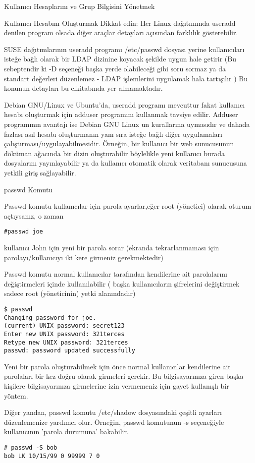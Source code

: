 \begin{section}{Kullanıcı Hesaplarını ve Grup Bilgisini Yönetmek}
\begin{subsection}{Kullanıcı Hesabını Oluşturmak}
Dikkat edin: Her Linux dağıtımında useradd denilen program olsada diğer araçlar detayları açısından farklılık gösterebilir.

SUSE dağıtımlarının useradd programı /etc/passwd dosyası yerine kullanıcıları isteğe bağlı olarak bir LDAP dizinine koyacak şekilde uygun hale getirir (Bu sebeptendir ki -D seçeneği başka yerde olabileceği gibi soru sormaz ya da standart değerleri düzenlemez - LDAP işlemlerini uygulamak hala tartışılır ) Bu konunun detayları bu elkitabında yer almamaktadır.

Debian GNU/Linux ve Ubuntu'da, useradd programı mevcuttur fakat kullanıcı hesabı oluşturmak için adduser programını kullanmak tavsiye edilir. Adduser
programının avantajı ise Debian GNU Linux un kurallarına uymasıdır ve dahada fazlası asıl hesabı oluşturmanın yanı sıra isteğe bağlı diğer uygulamaları çalıştırması/uygulayabilmesidir. Örneğin, bir kullanıcı bir web sunucusunun döküman ağacında bir dizin oluşturabilir böylelikle yeni kullanıcı burada dosyalarını yayınlayabilir ya da kullanıcı otomatik olarak veritabanı sunucusuna yetkili giriş sağlayabilir.
\end{subsection}
\begin{subsection}{passwd Komutu}

Passwd komutu kullanıcılar için parola ayarlar,eğer root (yönetici) olarak oturum açtıysanız, o zaman
\begin{verbatim}
#passwd joe
\end{verbatim}

kullanıcı John için yeni bir parola sorar (ekranda tekrarlanmaması için parolayı/kullanıcıyı iki kere girmeniz gerekmektedir)

Passwd komutu normal kullanıcılar tarafından kendilerine ait parolalarını değiştirmeleri içinde kullanılabilir ( başka kullanıcıların
şifrelerini değiştirmek sadece root (yöneticinin) yetki alanındadır)
\begin{verbatim}
$ passwd
Changing password for joe.
(current) UNIX password: secret123
Enter new UNIX password: 321terces
Retype new UNIX password: 321terces
passwd: password updated successfully
\end{verbatim}

Yeni bir parola oluşturabilmek için önce normal kullanıcılar kendilerine ait parolaları bir kez doğru olarak girmeleri gerekir. Bu bilgisayarınıza giren başka kişilere bilgisayarınıza girmelerine izin vermemeniz için gayet kullanışlı bir yöntem.

Diğer yandan, passwd komutu /etc/shadow dosyasındaki çeşitli ayarları düzenlemenize yardımcı olur. Örneğin, passwd komutunun -s seçeneğiyle kullanıcının
'parola durumuna' bakabilir.
\begin{verbatim}
# passwd -S bob
bob LK 10/15/99 0 99999 7 0
\end{verbatim}


\end{subsection}
\end{section}
